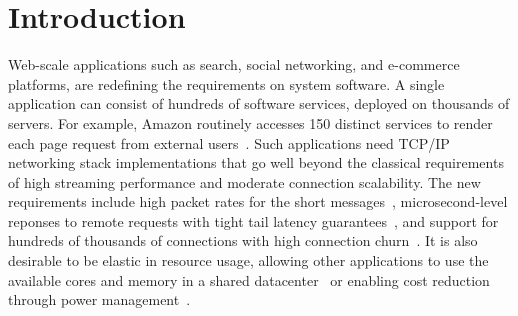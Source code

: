 
\section{Introduction}
\label{sec:intro}


Web-scale applications such as search, social networking, and
e-commerce platforms, are redefining the requirements on system
software. A single application can consist of hundreds of software
services, deployed on thousands of servers. For example, Amazon
routinely accesses 150 distinct services to render each page request
from external users~\cite{DBLP:conf/sosp/DeCandiaHJKLPSVV07}. Such
applications need TCP/IP networking stack implementations that go well
beyond the classical requirements of high streaming performance and
moderate connection scalability. The new requirements include high
packet rates for the short messages~\cite{Atikoglu:2012:WAL,missing-other},
microsecond-level reponses to remote requests with tight tail latency
guarantees~\cite{DBLP:journals/cacm/DeanB13}, and support for hundreds
of thousands of connections with high connection
churn~\cite{nishtala2013scaling,missing-other}. It is also desirable to be
elastic in resource usage, allowing other applications to use the
available cores and memory in a shared
datacenter~\cite{nishtala2013scaling} or enabling cost reduction
through power management~\cite{DBLP:journals/computer/BarrosoH07}.



